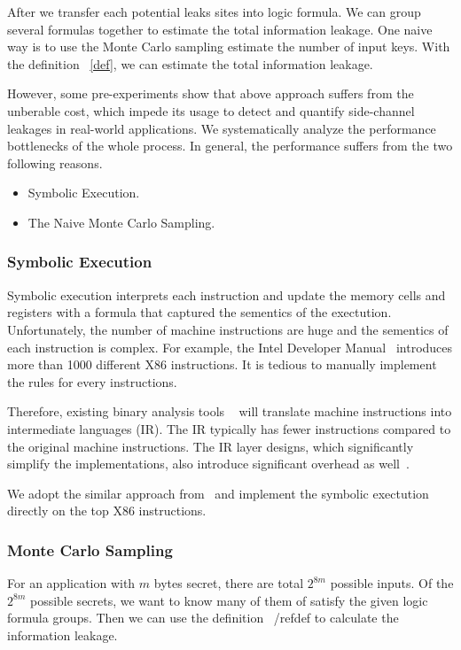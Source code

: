 After we transfer each potential leaks sites into logic formula. We can group several formulas together
to estimate the total information leakage. One naive way is to use the Monte Carlo sampling  estimate the
number of input keys. With the definition ~\ref{def}, we can estimate the total information leakage.

However, some pre-experiments show that above approach suffers from the unberable cost, which impede its usage
to detect and quantify side-channel leakages in real-world applications. 
We systematically analyze the performance bottlenecks of the whole process. In general, the performance suffers
from the two following reasons. 
\begin{itemize}
    \item Symbolic Execution. 
    \item The Naive Monte Carlo Sampling.
\end{itemize}

\subsubsection{Symbolic Execution}
Symbolic execution interprets each instruction and update the memory cells and registers with a 
formula that captured the sementics of the exectution. Unfortunately, the number of machine instructions 
are huge and the sementics of each instruction is complex. For example, the Intel Developer Manual~\cite{intelsys}
introduces more than 1000 different X86 instructions. It is tedious to manually implement the
rules for every instructions.

Therefore, existing binary analysis tools ~\cite{shoshitaishvili2016state, 10.1007/978-3-642-22110-1_37} 
will translate machine instructions into intermediate languages (IR). The IR typically has fewer 
instructions compared to the original machine instructions. The IR layer designs, which significantly
simplify the implementations, also introduce significant overhead as well~\cite{217563}.

We adopt the similar approach from~\cite{217563} and implement the symbolic exectution directly on
the top X86 instructions.

\subsubsection{Monte Carlo Sampling}
For an application with $m$ bytes secret, there are total $2^{8m}$ possible inputs. Of the
$2^{8m}$ possible secrets, we want to know many of them of satisfy the given logic formula groups.
Then we can use the definition ~/ref{def} to calculate the information leakage.

